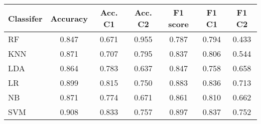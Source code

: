 \begin{tabular}{l|c|c|c|c|c|c}
\toprule
Classifer &  Accuracy &  Acc. C1 &  Acc. C2 &  F1 score &  F1 C1 &  F1 C2 \\
\midrule
       RF &     0.847 &    0.671 &    0.955 &     0.787 &  0.794 &  0.433 \\
      KNN &     0.871 &    0.707 &    0.795 &     0.837 &  0.806 &  0.544 \\
      LDA &     0.864 &    0.783 &    0.637 &     0.847 &  0.758 &  0.658 \\
       LR &     0.899 &    0.815 &    0.750 &     0.883 &  0.836 &  0.713 \\
       NB &     0.871 &    0.774 &    0.671 &     0.861 &  0.810 &  0.662 \\
      SVM &     0.908 &    0.833 &    0.757 &     0.897 &  0.837 &  0.752 \\
\bottomrule
\end{tabular}
